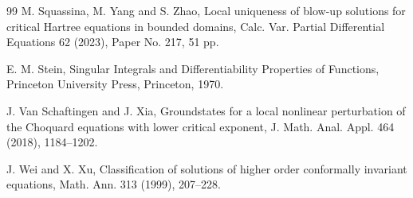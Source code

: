 \documentclass[11pt]{article}
\numberwithin{equation}{section}
\begin{document}
\begin{thebibliography}{99}
M. Squassina, M. Yang and S. Zhao,
Local uniqueness of blow-up solutions for critical Hartree equations in bounded domains,
Calc. Var. Partial Differential Equations 62 (2023), Paper No. 217, 51 pp.

E. M. Stein,
Singular Integrals and Differentiability Properties of Functions,
Princeton University Press, Princeton, 1970.

J. Van Schaftingen and J. Xia,
Groundstates for a local nonlinear perturbation of the Choquard equations with lower critical exponent,
J. Math. Anal. Appl. 464 (2018), 1184--1202.

J. Wei and X. Xu,
Classification of solutions of higher order conformally invariant equations,
Math. Ann. 313 (1999), 207--228.

\end{thebibliography}
\end{document}
